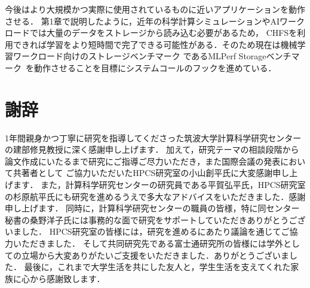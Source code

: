 \documentclass[a4paper，11pt]{jreport}
\begin{document}
今後はより大規模かつ実際に使用されているものに近いアプリケーションを動作させる．
第1章で説明したように，近年の科学計算シミュレーションやAIワークロードでは大量のデータをストレージから読み込む必要があるため，
CHFSを利用できれば学習をより短時間で完了できる可能性がある．そのため現在は機械学習ワークロード向けのストレージベンチマーク
であるMLPerf Storageベンチマーク~\cite{mlperfstorage}を動作させることを目標にシステムコールのフックを進めている．

\chapter*{謝辞}
1年間親身かつ丁寧に研究を指導してくださった筑波大学計算科学研究センターの建部修見教授に深く感謝申し上げます．
加えて，研究テーマの相談段階から論文作成にいたるまで研究にご指導ご尽力いただき，また国際会議の発表において共著者として
ご協力いただいたHPCS研究室の小山創平氏に大変感謝申し上げます．
また，計算科学研究センターの研究員である平賀弘平氏，HPCS研究室の杉原航平氏にも研究を進めるうえで多大なアドバイスをいただきました．感謝申し上げます．
同時に，計算科学研究センターの職員の皆様，特に同センター秘書の桑野洋子氏には事務的な面で研究をサポートしていただきありがとうございました．
HPCS研究室の皆様には，研究を進めるにあたり議論を通じてご協力いただきました．
そして共同研究先である富士通研究所の皆様には学外としての立場から大変ありがたいご支援をいただきました．ありがとうございました．
最後に，これまで大学生活を共にした友人と，学生生活を支えてくれた家族に心から感謝致します．

\newpage

\renewcommand{\bibname}{参考文献}



\end{document}
